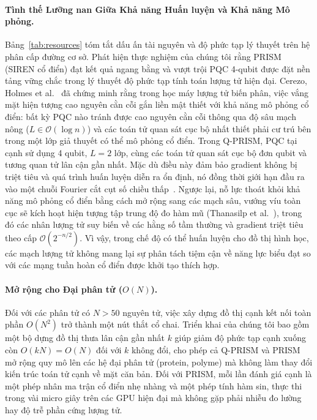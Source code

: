 \documentclass[10pt,twocolumn,letterpaper]{article}
\begin{document}
\paragraph{Tình thế Lưỡng nan Giữa Khả năng Huấn luyện và Khả năng Mô phỏng.}
Bảng~\ref{tab:resources} tóm tắt dấu ấn tài nguyên và độ phức tạp lý thuyết trên hệ phân cấp đường cơ sở.
Phát hiện thực nghiệm của chúng tôi rằng PRISM (SIREN cổ điển) đạt kết quả ngang bằng và vượt trội PQC 4-qubit được đặt nền tảng vững chắc trong lý thuyết độ phức tạp tính toán lượng tử hiện đại.
Cerezo, Holmes et al.~\cite{Cerezo:2023nqf} đã chứng minh rằng trong học máy lượng tử biến phân, việc vắng mặt hiện tượng cao nguyên cằn cỗi gắn liền mật thiết với khả năng mô phỏng cổ điển: bất kỳ PQC nào tránh được cao nguyên cằn cỗi thông qua độ sâu mạch nông ($L \in \mathcal{O}(\log n)$) và các toán tử quan sát cục bộ nhất thiết phải cư trú bên trong một lớp giả thuyết có thể mô phỏng cổ điển.
Trong Q-PRISM, PQC tại cạnh sử dụng 4 qubit, $L = 2$ lớp, cùng các toán tử quan sát cục bộ đơn qubit và tương quan tử lân cận gần nhất.
Mặc dù điều này đảm bảo gradient không bị triệt tiêu và quá trình huấn luyện diễn ra ổn định, nó đồng thời giới hạn đầu ra vào một chuỗi Fourier cắt cụt số chiều thấp~\cite{landman2023approximating, Schuld:2020enb}.
Ngược lại, nỗ lực thoát khỏi khả năng mô phỏng cổ điển bằng cách mở rộng sang các mạch sâu, vướng víu toàn cục sẽ kích hoạt hiện tượng tập trung độ đo hàm mũ (Thanasilp et al.~\cite{Thanasilp:2022agd}), trong đó các nhân lượng tử suy biến về các hằng số tầm thường và gradient triệt tiêu theo cấp $\mathcal{O}(2^{-n/2})$.
Vì vậy, trong chế độ có thể huấn luyện cho đồ thị hình học, các mạch lượng tử không mang lại sự phân tách tiệm cận về năng lực biểu đạt so với các mạng tuần hoàn cổ điển được khởi tạo thích hợp.

\paragraph{Mở rộng cho Đại phân tử ($O(N)$).}
Đối với các phân tử có $N > 50$ nguyên tử, việc xây dựng đồ thị cạnh kết nối toàn phần $O(N^2)$ trở thành một nút thắt cổ chai. Triển khai của chúng tôi bao gồm một bộ dựng đồ thị thưa lân cận gần nhất $k$ giúp giảm độ phức tạp cạnh xuống còn $O(kN) = O(N)$ đối với $k$ không đổi, cho phép cả Q-PRISM và PRISM mở rộng quy mô lên các hệ đại phân tử (protein, polyme) mà không làm thay đổi kiến trúc toán tử cạnh về mặt căn bản.
Đối với PRISM, mỗi lần đánh giá cạnh là một phép nhân ma trận cổ điển nhẹ nhàng và một phép tính hàm sin, thực thi trong vài micro giây trên các GPU hiện đại mà không gặp phải nhiễu đo lường hay độ trễ phần cứng lượng tử.
\end{document}
